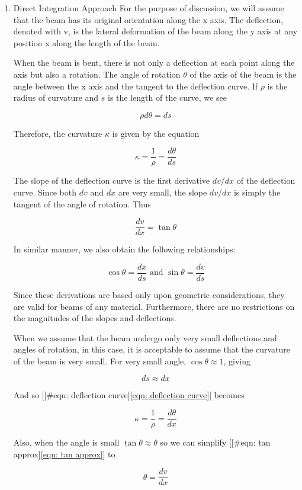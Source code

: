 \documentclass[a4paper,openany,12pt]{book}
\begin{document}
\begin{enumerate}
\item Direct Integration Approach
\label{direct-integration-approach}
For the purpose of discussion, we will assume that the beam has its
original orientation along the x axis. The deflection, denoted with v,
is the lateral deformation of the beam along the y axis at any position
x along the length of the beam.

When the beam is bent, there is not only a deflection at each point
along the axis but also a rotation. The angle of rotation \(\theta\) of
the axis of the beam is the angle between the x axis and the tangent to
the deflection curve. If \(\rho\) is the radius of curvature and \(s\) is
the length of the curve, we see


$$\rho d\theta  = ds$$

Therefore, the curvature \(\kappa\) is given by the equation

$$ \kappa  = \frac{1}{\rho } = \frac{d\theta }{ds}$$

The slope of the deflection curve is the first derivative \(dv/dx\) of the
deflection curve. Since both \(dv\) and \(dx\) are very small, the slope
\(dv/dx\) is simply the tangent of the angle of rotation. Thus

$$ \frac{dv}{dx} = \tan \theta$$

In similar manner, we also obtain the following relationships:

$$\cos \theta  = \frac{dx}{ds} \text{ and } \sin \theta  = \frac{dv}{ds}$$

Since these derivations are based only upon geometric considerations,
they are valid for beams of any material. Furthermore, there are no
restrictions on the magnitudes of the slopes and deflections.

When we assume that the beam undergo only very small deflections and
angles of rotation, in this case, it is acceptable to assume that the
curvature of the beam is very small. For very small angle,
\(\cos\theta \approx 1\), giving

$$ds \approx dx$$

And so [[\#eqn: deflection curve]\ref{eqn: deflection curve}] becomes

$$ \kappa  = \frac{1}{\rho } = \frac{d\theta }{dx}$$

Also, when the angle is small \(\tan\theta \approx \theta\) so we can
simplify [[\#eqn: tan approx]\ref{eqn: tan approx}] to

$$\theta  = \frac{dv}{dx}$$


\end{enumerate}
\end{document}
